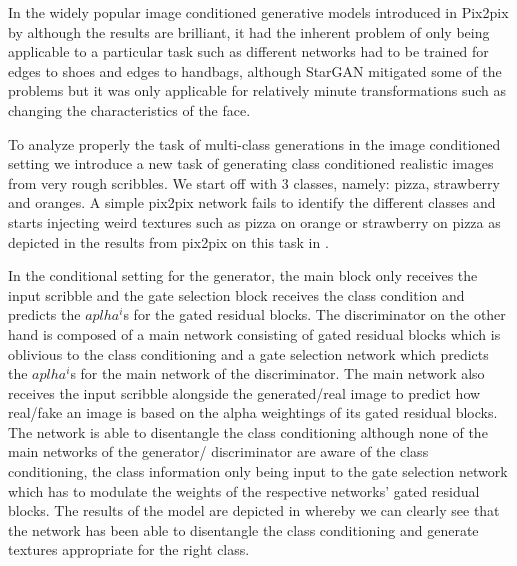 
In the widely popular image conditioned generative models introduced in Pix2pix by \cite{isola2016image2image} although the results are brilliant, it had the inherent problem of only being applicable to a particular task such as different networks had to be trained for edges to shoes and edges to handbags, although StarGAN \cite{choi2017stargan} mitigated some of the problems but it was only applicable for relatively minute transformations such as changing the characteristics of the face.

To analyze properly the task of multi-class generations in the image conditioned setting we introduce a new task of generating class conditioned realistic images from very rough scribbles. We start off with 3 classes, namely: pizza, strawberry and oranges. A simple pix2pix network fails to identify the different classes and starts injecting weird textures such as pizza on orange or strawberry on pizza as depicted in the results from pix2pix on this task in . 

In the conditional setting for the generator, the main block only receives the input scribble and the gate selection block receives the class condition and predicts the $aplha^i$s for the gated residual blocks. The discriminator on the other hand is composed of a main network consisting of gated residual blocks which is oblivious to the class conditioning and a gate selection network which predicts the $aplha^i$s for the main network of the discriminator. The main network also receives the input scribble alongside the generated/real image to predict how real/fake an image is based on the alpha weightings of its gated residual blocks. The network is able to disentangle the class conditioning although none of the main networks of the generator/ discriminator are aware of the class conditioning, the class information only being input to the gate selection network which has to modulate the weights of the respective networks' gated residual blocks. The results of the model are depicted in  whereby we can clearly see that the network has been able to disentangle the class conditioning and generate textures appropriate for the right class.

